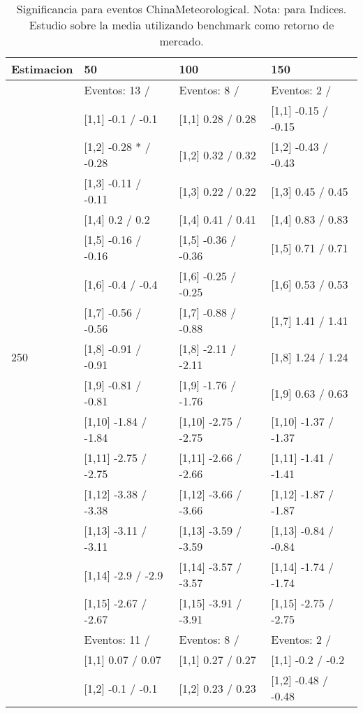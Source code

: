 \begin{table}

\caption{Significancia para eventos ChinaMeteorological. Nota: para Indices. Estudio sobre la media utilizando benchmark como retorno de mercado.}
\centering
\begin{tabular}[t]{llll}
\toprule
Estimacion & 50 & 100 & 150\\
\midrule
 & Eventos:  13 / & Eventos:  8 / & Eventos:  2 /\\
 & {}[1,1] -0.1  / -0.1 & {}[1,1] 0.28  / 0.28 & {}[1,1] -0.15  / -0.15\\
 & {}[1,2] -0.28 * / -0.28 & {}[1,2] 0.32  / 0.32 & {}[1,2] -0.43  / -0.43\\
 & {}[1,3] -0.11  / -0.11 & {}[1,3] 0.22  / 0.22 & {}[1,3] 0.45  / 0.45\\
 & {}[1,4] 0.2  / 0.2 & {}[1,4] 0.41  / 0.41 & {}[1,4] 0.83  / 0.83\\
\addlinespace
 & {}[1,5] -0.16  / -0.16 & {}[1,5] -0.36  / -0.36 & {}[1,5] 0.71  / 0.71\\
 & {}[1,6] -0.4  / -0.4 & {}[1,6] -0.25  / -0.25 & {}[1,6] 0.53  / 0.53\\
 & {}[1,7] -0.56  / -0.56 & {}[1,7] -0.88  / -0.88 & {}[1,7] 1.41  / 1.41\\
250 & {}[1,8] -0.91  / -0.91 & {}[1,8] -2.11  / -2.11 & {}[1,8] 1.24  / 1.24\\
 & {}[1,9] -0.81  / -0.81 & {}[1,9] -1.76  / -1.76 & {}[1,9] 0.63  / 0.63\\
\addlinespace
 & {}[1,10] -1.84  / -1.84 & {}[1,10] -2.75  / -2.75 & {}[1,10] -1.37  / -1.37\\
 & {}[1,11] -2.75  / -2.75 & {}[1,11] -2.66  / -2.66 & {}[1,11] -1.41  / -1.41\\
 & {}[1,12] -3.38  / -3.38 & {}[1,12] -3.66  / -3.66 & {}[1,12] -1.87  / -1.87\\
 & {}[1,13] -3.11  / -3.11 & {}[1,13] -3.59  / -3.59 & {}[1,13] -0.84  / -0.84\\
 & {}[1,14] -2.9  / -2.9 & {}[1,14] -3.57  / -3.57 & {}[1,14] -1.74  / -1.74\\
\addlinespace
 & {}[1,15] -2.67  / -2.67 & {}[1,15] -3.91  / -3.91 & {}[1,15] -2.75  / -2.75\\
 & Eventos:  11 / & Eventos:  8 / & Eventos:  2 /\\
 & {}[1,1] 0.07  / 0.07 & {}[1,1] 0.27  / 0.27 & {}[1,1] -0.2  / -0.2\\
 & {}[1,2] -0.1  / -0.1 & {}[1,2] 0.23  / 0.23 & {}[1,2] -0.48  / -0.48\\

\end{tabular}
\end{table}
